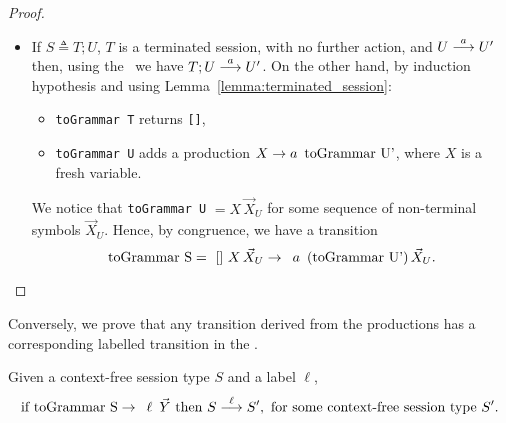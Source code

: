 \begin{proof}
\begin{itemize}
	\item If $S\triangleq T;U$, $T$ is a terminated session, with no further 
	      action, and $U \LTSderives[a] U'$ then, using the \LTS\ we have
	      $T;U \LTSderives[a] U'$. On the other hand, by induction hypothesis and 
	      using Lemma~\ref{lemma:terminated_session}:
	    \begin{itemize}
			\item \lstinline{toGrammar T}  returns \lstinline{[]},
			\item \lstinline{toGrammar U}  adds a production 
			$X \rightarrow a \enspace \text{\lstinline{toGrammar U'}}$, where $X$
			is a fresh variable.
		\end{itemize}
		We notice that \lstinline{toGrammar U} $= X \, \vec X_U$ for some sequence of 
		non-terminal symbols $\vec X_U$. Hence, by congruence, we have a 
		transition 
		\[\text{\lstinline{toGrammar S}} = \, \text{\lstinline{[]}} \, X \, 
		\vec X_U \rightarrow \enspace a \enspace \text{(\lstinline{toGrammar U'})} \, 
		\vec X_U.\]
\end{itemize}
\end{proof}

Conversely, we prove that any transition derived from the productions 
has a corresponding labelled transition in the \LTS.

\begin{lemma}
Given a context-free session type $S$ and a label $\ell$,
	\[ \text{if } \text{\lstinline{toGrammar S}} \rightarrow \enspace \ell \enspace 
	 \vec Y \text{ then } S \LTSderives[\ell] S', \text{ for some context-free session type $S'$}.\]
\end{lemma}

